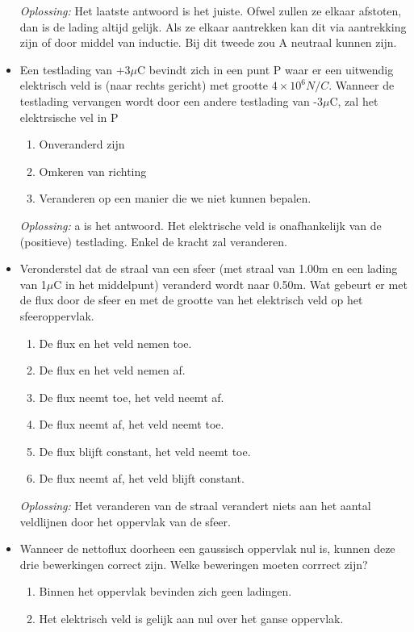\documentclass[12pt,a4paper]{article}
\begin{document}
\begin{itemize}
\begin{enumerate}[label=\alph*]
	\end{enumerate}
	\textit{Oplossing:} Het laatste antwoord is het juiste. Ofwel zullen ze elkaar afstoten, dan is de lading altijd gelijk. Als ze elkaar aantrekken kan dit via aantrekking zijn of door middel van inductie. Bij dit tweede zou A neutraal kunnen zijn. 
	\item Een testlading van +3$\mu$C bevindt zich in een punt P waar er een uitwendig elektrisch veld is (naar rechts gericht) met grootte \(4 \times 10^6 N/C\). Wanneer de testlading vervangen wordt door een andere testlading van -3$\mu$C, zal het elektrsische vel in P
	\begin{enumerate}[label=\alph*]
		\item Onveranderd zijn
		\item Omkeren van richting
		\item Veranderen op een manier die we niet kunnen bepalen. 
	\end{enumerate}
	\textit{Oplossing:} a is het antwoord. Het elektrische veld is onafhankelijk van de (positieve) testlading. Enkel de kracht zal veranderen. 
	\item Veronderstel dat de straal van een sfeer (met straal van 1.00m en een lading van 1$\mu$C in het middelpunt) veranderd wordt naar 0.50m. Wat gebeurt er met de flux door de sfeer en met de grootte van het elektrisch veld op het sfeeroppervlak. 
	\begin{enumerate}[label=\alph*]
		\item De flux en het veld nemen toe.
		\item De flux en het veld nemen af. 
		\item De flux neemt toe, het veld neemt af. 
		\item De flux neemt af, het veld neemt toe. 
		\item De flux blijft constant, het veld neemt toe.
		\item De flux neemt af, het veld blijft constant.
	\end{enumerate}
	\textit{Oplossing:} Het veranderen van de straal verandert niets aan het aantal veldlijnen door het oppervlak van de sfeer. 
	\item Wanneer de nettoflux doorheen een gaussisch oppervlak nul is, kunnen deze drie bewerkingen correct zijn. Welke beweringen moeten corrrect zijn?
	\begin{enumerate}[label=\alph*]
		\item Binnen het oppervlak bevinden zich geen ladingen.
		\item Het elektrisch veld is gelijk aan nul over het ganse oppervlak.

\end{enumerate}
\end{itemize}
\end{document}
